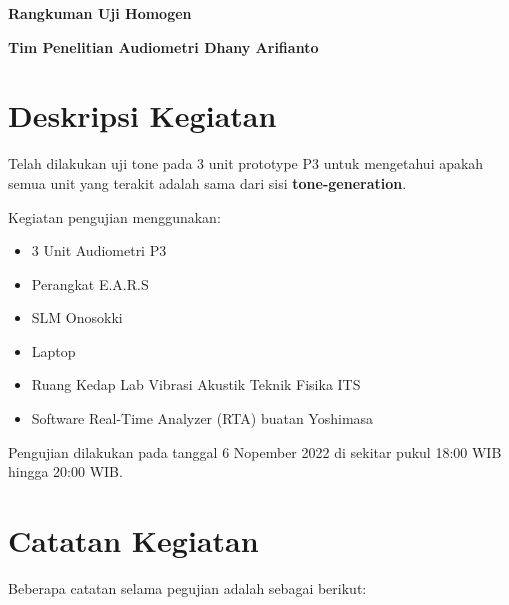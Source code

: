 \documentclass{article} %
\begin{document}
	\begin{titlepage}

		\centering %

		{
			\LARGE %
			\bf %
			Rangkuman Uji Homogen
		}

		\bigskip
		{\Large \bf Tim Penelitian Audiometri Dhany Arifianto}
		\vfill %
	\end{titlepage}

	\newpage
	\section{Deskripsi Kegiatan}

	Telah dilakukan uji tone pada 3 unit prototype P3 untuk mengetahui apakah semua unit yang terakit
	adalah sama dari sisi \textbf{tone-generation}.

	Kegiatan pengujian menggunakan:
	\begin{itemize}
		\item 3 Unit Audiometri P3
		\item Perangkat E.A.R.S
		\item SLM Onosokki
		\item Laptop
		\item Ruang Kedap Lab Vibrasi Akustik Teknik Fisika ITS
		\item Software Real-Time Analyzer (RTA) buatan Yoshimasa
	\end{itemize}

	Pengujian dilakukan pada tanggal 6 Nopember 2022 di sekitar pukul 18:00 WIB hingga 20:00 WIB.

	\section{Catatan Kegiatan}

	Beberapa catatan selama pegujian adalah sebagai berikut:
\end{document}
